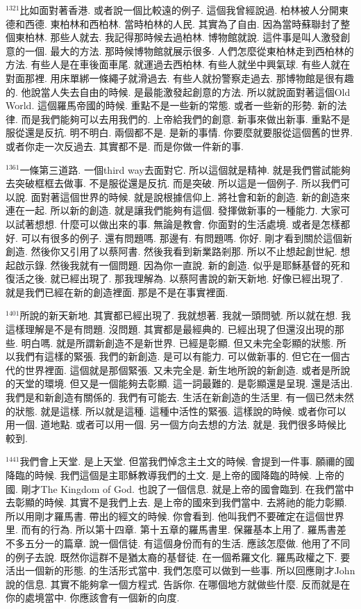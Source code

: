\documentclass{book}
\begin{document}
$^{1321}$比如面對著香港.
或者說一個比較遠的例子.
這個我曾經說過.
柏林被人分開東德和西德.
東柏林和西柏林.
當時柏林的人民.
其實為了自由.
因為當時蘇聯封了整個東柏林.
那些人就去.
我記得那時候去過柏林.
博物館就說.
這件事是叫人激發創意的一個.
最大的方法.
那時候博物館就展示很多.
人們怎麼從東柏林走到西柏林的方法.
有些人是在車後面車尾.
就運過去西柏林.
有些人就坐中興氣球.
有些人就在對面那裡.
用床單綁一條繩子就滑過去.
有些人就扮警察走過去.
那博物館是很有趣的.
他說當人失去自由的時候.
是最能激發起創意的方法.
所以就說面對著這個Old World.
這個羅馬帝國的時候.
重點不是一些新的常態.
或者一些新的形勢.
新的法律.
而是我們能夠可以去用我們的.
上帝給我們的創意.
新事來做出新事.
重點不是服從還是反抗.
明不明白.
兩個都不是.
是新的事情.
你要麼就要服從這個舊的世界.
或者你走一次反過去.
其實都不是.
而是你做一件新的事.

$^{1361}$一條第三道路.
一個third way去面對它.
所以這個就是精神.
就是我們嘗試能夠去突破框框去做事.
不是服從還是反抗.
而是突破.
所以這是一個例子.
所以我們可以說.
面對著這個世界的時候.
就是說根據信仰上.
將社會和新的創造.
新的創造來連在一起.
所以新的創造.
就是讓我們能夠有這個.
發揮做新事的一種能力.
大家可以試著想想.
什麼可以做出來的事.
無論是教會.
你面對的生活處境.
或者是怎樣都好.
可以有很多的例子.
還有問題嗎.
那邊有.
有問題嗎.
你好.
剛才看到關於這個新創造.
然後你又引用了以蔡阿書.
然後我看到新業路剎那.
所以不止想起創世紀.
想起啟示錄.
然後我就有一個問題.
因為你一直說.
新的創造.
似乎是耶穌基督的死和復活之後.
就已經出現了.
那我理解為.
以蔡阿書說的新天新地.
好像已經出現了.
就是我們已經在新的創造裡面.
那是不是在事實裡面.

$^{1401}$所說的新天新地.
其實都已經出現了.
我就想著.
我就一頭問號.
所以就在想.
我這樣理解是不是有問題.
沒問題.
其實都是最經典的.
已經出現了但還沒出現的那些.
明白嗎.
就是所謂新創造不是新世界.
已經是彰顯.
但又未完全彰顯的狀態.
所以我們有這樣的緊張.
我們的新創造.
是可以有能力.
可以做新事的.
但它在一個古代的世界裡面.
這個就是那個緊張.
又未完全是.
新生地所說的新創造.
或者是所說的天堂的環境.
但又是一個能夠去彰顯.
這一詞最難的.
是彰顯還是呈現.
還是活出.
我們是和新創造有關係的.
我們有可能去.
生活在新創造的生活里.
有一個已然未然的狀態.
就是這樣.
所以就是這種.
這種中活性的緊張.
這樣說的時候.
或者你可以用一個.
道地點.
或者可以用一個.
另一個方向去想的方法.
就是.
我們很多時候比較到.

$^{1441}$我們會上天堂.
是上天堂.
但當我們悼念主土文的時候.
會提到一件事.
願禰的國降臨的時候.
我們這個是主耶穌教導我們的土文.
是上帝的國降臨的時候.
上帝的國.
剛才The Kingdom of God.
也說了一個信息.
就是上帝的國會臨到.
在我們當中去彰顯的時候.
其實不是我們上去.
是上帝的國來到我們當中.
去將祂的能力彰顯.
所以用剛才羅馬書.
帶出的經文的時候.
你會看到.
他叫我們不要確定在這個世界里.
而有的行為.
所以第十四章.
第十五章的羅馬書里.
保羅基本上用了.
羅馬書差不多五分一的篇章.
說一個信徒.
有這個身份而有的生活.
應該怎麼做.
他用了不同的例子去說.
既然你這群不是猶太裔的基督徒.
在一個希羅文化.
羅馬政權之下.
要活出一個新的形態.
的生活形式當中.
我們怎麼可以做到一些事.
所以回應剛才John說的信息.
其實不能夠拿一個方程式.
告訴你.
在哪個地方就做些什麼.
反而就是在你的處境當中.
你應該會有一個新的向度.
\end{document}
